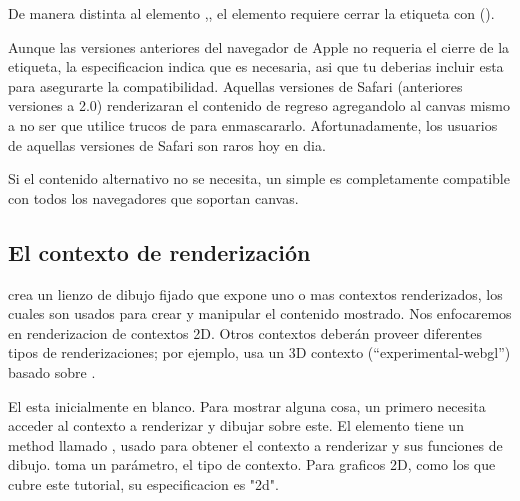 De manera distinta al elemento ,, el elemento  requiere cerrar la etiqueta con ().

\vspace{0.5cm} %
\begin{tcolorbox}
	[colback=red!5!white,colframe=cyan,fonttitle=\bfseries,title={\faLightbulbO\, Nota:}]

	Aunque las versiones anteriores del navegador  de Apple no requeria el cierre de la etiqueta, la especificacion indica que es necesaria, asi que tu deberias incluir esta para asegurarte la compatibilidad. Aquellas versiones de Safari (anteriores versiones a 2.0) renderizaran el contenido de regreso agregandolo al canvas mismo a no ser que utilice trucos de  para enmascararlo. Afortunadamente, los usuarios de aquellas versiones de Safari son raros hoy en dia.
\end{tcolorbox}
\vspace{0.5cm} %

Si el contenido alternativo no se necesita, un simple  es completamente compatible con todos los navegadores que soportan canvas.

\newpage %
\subsection{El contexto de renderización}

 crea un lienzo de dibujo fijado que expone uno o mas contextos renderizados, los cuales son usados para crear y manipular el contenido mostrado. Nos enfocaremos en renderizacion de contextos 2D. Otros contextos deberán proveer diferentes tipos de renderizaciones; por ejemplo,  usa un 3D contexto (``experimental-webgl'') basado sobre .

El  esta inicialmente en blanco. Para mostrar alguna cosa, un  primero necesita acceder al contexto a renderizar y dibujar sobre este. El elemento  tiene un method llamado , usado para obtener el contexto a renderizar y sus funciones de dibujo.  toma un parámetro, el tipo de contexto. Para graficos 2D, como los que cubre este tutorial, su especificacion es "2d".

